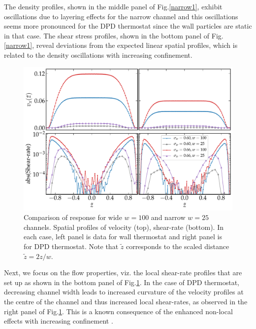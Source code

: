 The density profiles, shown in the middle panel of Fig.\ref{narrow1}, exhibit oscillations due to layering effects for the narrow channel and this oscillations seems more pronounced for the DPD thermostat since the wall particles are static in that case. The shear stress profiles, shown in the bottom panel of  Fig.\ref{narrow1}, reveal deviations from the expected linear spatial profiles, which is related to the density oscillations with increasing confinement.


\begin{figure}
\centering
\includegraphics[width=15cm]{figs/cw2.pdf}
\caption[{\em Comparison of response for wide $w=100$ and narrow $w=25$ channels: spatial profiles of velocity and shear rate}]{Comparison of response for wide $w=100$ and narrow $w=25$ channels. Spatial profiles of  velocity (top), shear-rate (bottom). In each case, left panel is data
for wall thermostat and right panel is for DPD thermostat. Note that $\tilde{z}$ corresponds to the scaled distance $\tilde{z}=2z/w$.}
\label{narrow2}
\end{figure}

Next, we focus on the flow properties, viz. the local shear-rate profiles that are set up as shown in the bottom panel of Fig.\ref{narrow2}. In the case of DPD thermostat, decreasing channel width leads to increased curvature of the velocity profiles at the centre of the channel and thus increased local shear-rates, as observed in the right panel of Fig.\ref{narrow2}. This is a known consequence of the enhanced non-local effects with increasing confinement \cite{goyon2008spatial, mansard2013molecular}. 

